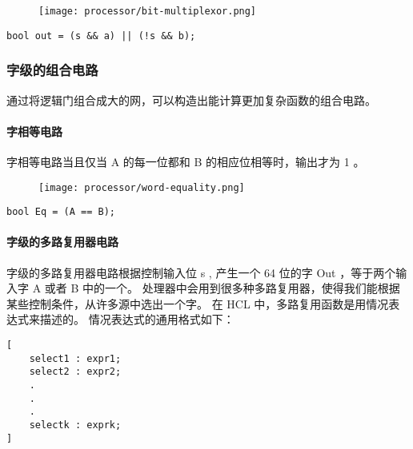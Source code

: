 \begin{figure}[H]
    \centering
    \texttt{[image: processor/bit-multiplexor.png]}
\end{figure}
\begin{lstlisting}[style=CStyle]
bool out = (s && a) || (!s && b);
\end{lstlisting}

\subsubsection{字级的组合电路}

通过将逻辑门组合成大的网，可以构造出能计算更加复杂函数的组合电路。

\paragraph{字相等电路}

字相等电路当且仅当 A 的每一位都和 B 的相应位相等时，输出才为 1 。

\begin{figure}[H]
    \centering
    \texttt{[image: processor/word-equality.png]}
\end{figure}
\begin{lstlisting}[style=CStyle]
bool Eq = (A == B);
\end{lstlisting}

\paragraph{字级的多路复用器电路}

字级的多路复用器电路根据控制输入位 s , 产生一个 64 位的字 Out ，等于两个输入字 A 或者 B 中的一个。
处理器中会用到很多种多路复用器，使得我们能根据某些控制条件，从许多源中选出一个字。
在 HCL 中，多路复用函数是用情况表达式来描述的。
情况表达式的通用格式如下：
\begin{lstlisting}[style=CStyle]
[
    select1 : expr1;
    select2 : expr2;
    .
    .
    .
    selectk : exprk;
]
\end{lstlisting}

